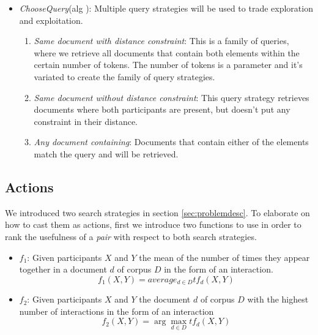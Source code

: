 \documentclass[12pt]{article}
\begin{document}
\begin{itemize}
  \item \emph{ChooseQuery}(alg ): Multiple query strategies will be used to trade exploration and exploitation. 
		\begin{enumerate}
		  \item \emph{Same document with distance constraint}: This is a family of queries, where we retrieve all documents that contain both elements within the certain number of tokens. The number of tokens is a parameter and it's variated to create the family of query strategies.
		  \item \emph{Same document without distance constraint}: This query strategy retrieves documents where both participants are present, but doesn't put any constraint in their distance.
		  \item \emph{Any document containing}: Documents that contain either of the elements match the query and will be retrieved.
		\end{enumerate}

\end{itemize}




\subsection{Actions}
We introduced two search strategies in section \ref{sec:problemdesc}. To elaborate on how to cast them as actions, first we introduce two functions to use in order to rank the usefulness of a \emph{pair} with respect to both search strategies.

\begin{itemize}
  \item $f_1$: Given participants $X$ and $Y$ the mean of the number of times they appear together in a document $d$ of corpus $D$ in the form of an interaction.  		\begin{equation}
  \label{eq:f1}
  			f_1(X,Y) = average_{d\in D} tf_d(X,Y)
		\end{equation}
		
		\item $f_2$: Given participants $X$ and $Y$ the document $d$ of corpus $D$ with the highest number of interactions in the form of an interaction
		\begin{equation}
		\label{eq:f2}
  		f_2(X,Y) = \arg\max_{d\in D} tf_d(X,Y)
\end{equation}
\end{itemize}
\end{document}
